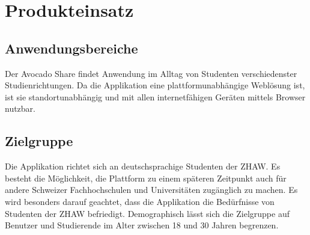 \section{Produkteinsatz}
\subsection{Anwendungsbereiche}
Der Avocado Share findet Anwendung im Alltag von Studenten verschiedenster Studienrichtungen. Da die Applikation eine plattformunabhängige Weblösung ist, ist sie standortunabhängig und mit allen internetfähigen Geräten mittels Browser nutzbar. 

\subsection{Zielgruppe}
Die Applikation richtet sich an deutschsprachige Studenten der ZHAW. Es besteht die Möglichkeit, die Plattform zu einem späteren Zeitpunkt auch für andere Schweizer Fachhochschulen und Universitäten zugänglich zu machen. Es wird besonders darauf geachtet, dass die Applikation die Bedürfnisse von Studenten der ZHAW befriedigt. Demographisch lässt sich die Zielgruppe auf Benutzer und Studierende im Alter zwischen 18 und 30 Jahren begrenzen.